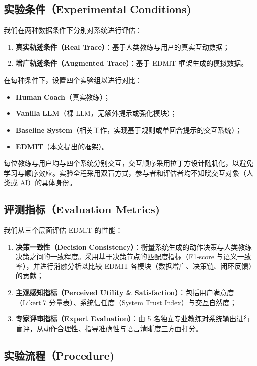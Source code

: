 \documentclass[sigconf]{acmart}
\begin{document}
\subsection{实验条件（Experimental Conditions)}

我们在两种数据条件下分别对系统进行评估：
\begin{enumerate}
  \item \textbf{真实轨迹条件（Real Trace）}：基于人类教练与用户的真实互动数据；
  \item \textbf{增广轨迹条件（Augmented Trace）}：基于 \textsc{EDMIT} 框架生成的模拟数据。
\end{enumerate}

在每种条件下，设置四个实验组以进行对比：
\begin{itemize}
  \item \textbf{Human Coach}（真实教练）；
  \item \textbf{Vanilla LLM}（裸 LLM，无额外提示或强化模块）；
  \item \textbf{Baseline System}（相关工作，实现基于规则或单回合提示的交互系统）；
  \item \textbf{EDMIT}（本文提出的框架）。
\end{itemize}

每位教练与用户均与四个系统分别交互，交互顺序采用拉丁方设计随机化，以避免学习与顺序效应。实验全程采用双盲方式，参与者和评估者均不知晓交互对象（人类或 AI）的具体身份。

\subsection{评测指标（Evaluation Metrics)}

我们从三个层面评估 \textsc{EDMIT} 的性能：
\begin{enumerate}
  \item \textbf{决策一致性（Decision Consistency）}：衡量系统生成的动作决策与人类教练决策之间的一致程度。采用基于决策节点的匹配度指标（F1-score 与语义一致率），并进行消融分析以比较 \textsc{EDMIT} 各模块（数据增广、决策链、闭环反馈）的贡献；
  \item \textbf{主观感知指标（Perceived Utility \& Satisfaction）}：包括用户满意度（Likert 7 分量表）、系统信任度（System Trust Index）与交互自然度；
  \item \textbf{专家评审指标（Expert Evaluation）}：由 5 名独立专业教练对系统输出进行盲评，从动作合理性、指导准确性与语言清晰度三方面打分。
\end{enumerate}

\subsection{实验流程（Procedure)}
\end{document}
